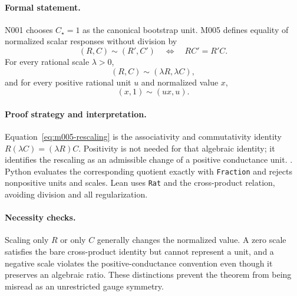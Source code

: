 
\paragraph*{Formal statement.}
N001 chooses $C_\star=1$ as the canonical bootstrap unit.  M005 defines equality
of normalized scalar responses without division by
\begin{equation}
  (R,C)\sim(R',C')
  \quad\Longleftrightarrow\quad
  RC'=R'C.
  \label{eq:m005-cross-product}
\end{equation}
For every rational scale $\lambda>0$,
\begin{equation}
  (R,C)\sim(\lambda R,\lambda C),
  \label{eq:m005-rescaling}
\end{equation}
and for every positive rational unit $u$ and normalized value $x$,
\begin{equation}
  (x,1)\sim(ux,u).
  \label{eq:m005-canonical-representative}
\end{equation}

\paragraph*{Proof strategy and interpretation.}
Equation~\eqref{eq:m005-rescaling} is the associativity and commutativity identity
$R(\lambda C)=(\lambda R)C$.  Positivity is not needed for that algebraic
identity; it identifies the rescaling as an admissible change of a positive
conductance unit.
\cite[Electrical network preliminaries]{DoyleSnell1984ElectricNetworks}.
Python evaluates the corresponding quotient exactly with
\texttt{Fraction} and rejects nonpositive units and scales.  Lean uses
\texttt{Rat} and the cross-product relation, avoiding division and all
regularization.

\paragraph*{Necessity checks.}
Scaling only $R$ or only $C$ generally changes the normalized value.  A zero
scale satisfies the bare cross-product identity but cannot represent a unit,
and a negative scale violates the positive-conductance convention even though
it preserves an algebraic ratio.  These distinctions prevent the theorem from
being misread as an unrestricted gauge symmetry.


